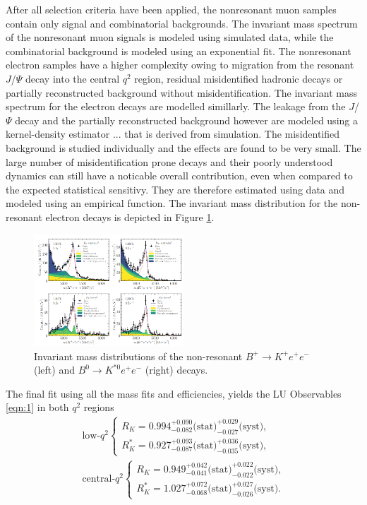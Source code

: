 \documentclass[%
 reprint,
 amsmath,amssymb,
 aps,
]{revtex4-2}
\begin{document}
After all selection criteria have been applied, the nonresonant muon samples
contain only signal and combinatorial backgrounds. The invariant mass spectrum of
the nonresonant muon signals is modeled using simulated data, while the combinatorial
background is modeled using an exponential fit.
The nonresonant electron samples have a higher complexity owing to migration from the resonant $J$/$\Psi$ decay into the central $q^2$ region, residual
misidentified hadronic decays or partially reconstructed background without misidentification.
The invariant mass spectrum for the electron decays are modelled simillarly. The leakage from the $J$/$\Psi$ decay and the partially reconstructed background
however are modeled using a kernel-density estimator ... 
that is derived from simulation. The misidentified background is studied individually and the effects are found to be very small. The large number 
of misidentification prone decays and their poorly understood dynamics can still have a noticable overall contribution, even when compared to the 
expected statistical sensitivy. They are therefore estimated using data and modeled using an empirical function. 
The invariant mass distribution for the non-resonant electron decays is depicted in Figure \ref{fig:4}.
\begin{figure}
    \centering
    \includegraphics[width=0.5\textwidth]{mass.png}
    \caption{Invariant mass distributions of the non-resonant $B^+ \rightarrow K^+ e^+ e^-$ (left) and $B^0 \rightarrow K^{*0} e^+ e^-$ (right) decays.}
    \label{fig:4}
\end{figure}
The final fit using all the mass fits and efficiencies, yields the LU Observables \eqref{eqn:1} in both $q^2$ regions
\begin{equation}
    \begin{array}{r}
    \text{low-} q^2\left\{\begin{array}{l}
    R_K=0.994_{-0.082}^{+0.090}\text{(stat)}_{-0.027}^{+0.029} \text{(syst),} \\
    R_K^*=0.927_{-0.087}^{+0.093}\text{(stat)}_{-0.035}^{+0.036}\text{(syst),}
    \end{array}\right. \\
    \text {central-} q^2\left\{\begin{array}{l}
    R_K=0.949_{-0.041}^{+0.042}\text{(stat)}_{-0.022}^{+0.022}\text{(syst),} \\
    R_K^*=1.027_{-0.068}^{+0.072}\text{(stat)}_{-0.026}^{+0.027} \text{(syst).}
    \end{array}\right.
    \end{array}
    \end{equation}
\end{document}
